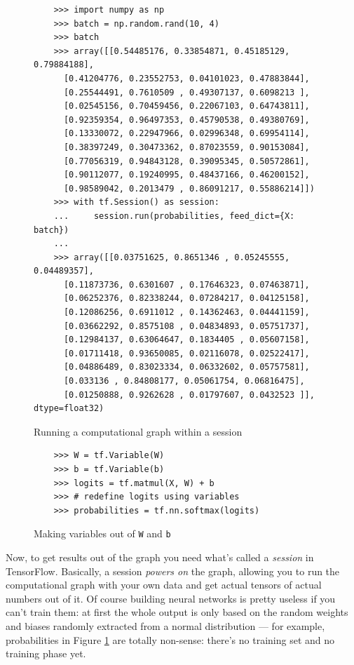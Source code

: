 \begin{figure}
  \begin{verbatim}
    >>> import numpy as np
    >>> batch = np.random.rand(10, 4)
    >>> batch
    >>> array([[0.54485176, 0.33854871, 0.45185129, 0.79884188],
      [0.41204776, 0.23552753, 0.04101023, 0.47883844],
      [0.25544491, 0.7610509 , 0.49307137, 0.6098213 ],
      [0.02545156, 0.70459456, 0.22067103, 0.64743811],
      [0.92359354, 0.96497353, 0.45790538, 0.49380769],
      [0.13330072, 0.22947966, 0.02996348, 0.69954114],
      [0.38397249, 0.30473362, 0.87023559, 0.90153084],
      [0.77056319, 0.94843128, 0.39095345, 0.50572861],
      [0.90112077, 0.19240995, 0.48437166, 0.46200152],
      [0.98589042, 0.2013479 , 0.86091217, 0.55886214]])
    >>> with tf.Session() as session:
    ...     session.run(probabilities, feed_dict={X: batch})
    ...
    >>> array([[0.03751625, 0.8651346 , 0.05245555, 0.04489357],
      [0.11873736, 0.6301607 , 0.17646323, 0.07463871],
      [0.06252376, 0.82338244, 0.07284217, 0.04125158],
      [0.12086256, 0.6911012 , 0.14362463, 0.04441159],
      [0.03662292, 0.8575108 , 0.04834893, 0.05751737],
      [0.12984137, 0.63064647, 0.1834405 , 0.05607158],
      [0.01711418, 0.93650085, 0.02116078, 0.02522417],
      [0.04886489, 0.83023334, 0.06332602, 0.05757581],
      [0.033136 , 0.84808177, 0.05061754, 0.06816475],
      [0.01250888, 0.9262628 , 0.01797607, 0.0432523 ]], dtype=float32)
  \end{verbatim}
  \caption{Running a computational graph within a session}
  \label{fig:use-session}
\end{figure}

\begin{figure}
  \begin{verbatim}
    >>> W = tf.Variable(W)
    >>> b = tf.Variable(b)
    >>> logits = tf.matmul(X, W) + b
    >>> # redefine logits using variables 
    >>> probabilities = tf.nn.softmax(logits)
  \end{verbatim}
  \caption{Making variables out of \texttt{W} and \texttt{b}}
  \label{fig:making-variables}
\end{figure}

Now, to get results out of the graph you need what's called a
\emph{session} in TensorFlow. Basically, a session \emph{powers on} the
graph, allowing you to run the computational graph with your own data
and get actual tensors of actual numbers out of it. Of course building
neural networks is pretty useless if you can't train them: at first the
whole output is only based on the random weights and biases randomly
extracted from a normal distribution --- for example, probabilities in
Figure \ref{fig:use-session} are totally non-sense: there's no training
set and no training phase yet.

